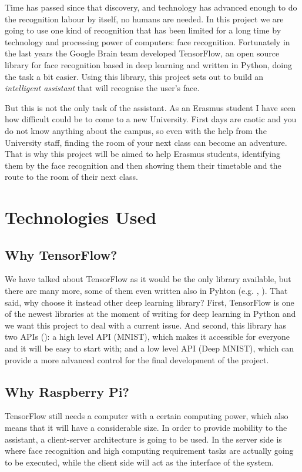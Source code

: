 Time has passed since that discovery, and technology has advanced enough to do the recognition labour by itself, no humans are needed. In this project we are going to use one kind of recognition that has been limited for a long time by technology and processing power of computers: face recognition. Fortunately in the last years the Google Brain team developed TensorFlow, an open source library for face recognition based in deep learning and written in Python, doing the task a bit easier. Using this library, this project sets out to build an \textit{intelligent assistant} that will recognise the user's face.

But this is not the only task of the assistant. As an Erasmus student I have seen how difficult could be to come to a new University. First days are caotic and you do not know anything about the campus, so even with the help from the University staff, finding the room of your next class can become an adventure. That is why this project will be aimed to help Erasmus students, identifying them by the face recognition and then showing them their timetable and the route to the room of their next class.

\section{Technologies Used}	

	\subsection{Why TensorFlow?}
	We have talked about TensorFlow as it would be the only library available, but there are many more, some of them even written also in Pyhton (e.g. \cite{theano_main_site}, \cite{caffe_main_site}). That said, why choose it instead other deep learning library? First, TensorFlow is one of the newest libraries at the moment of writing for deep learning in Python and we want this project to deal with a current issue. And second, this library has two APIs (\cite{tensorflow_main_website}): a high level API (MNIST), which makes it accessible for everyone and it will be easy to start with; and a low level API (Deep MNIST), which can provide a more advanced control for the final development of the project.

	\subsection{Why Raspberry Pi?}
	TensorFlow still needs a computer with a certain computing power, which also means that it will have a considerable size. In order to provide mobility to the assistant, a client-server architecture is going to be used. In the server side is where face recognition and high computing requirement tasks are actually going to be executed, while the client side will act as the interface of the system. 

